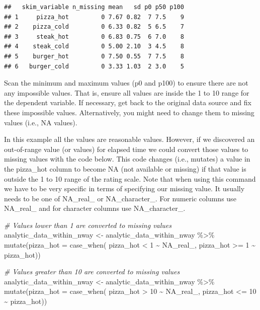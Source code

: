 \documentclass[
]{krantz}
\makeatletter
\newenvironment{Shaded}{\begin{snugshade}}{\end{snugshade}}
\newcommand{\AttributeTok}[1]{\textcolor[rgb]{0.61,0.61,0.61}{#1}}
\newcommand{\CommentTok}[1]{\textcolor[rgb]{0.37,0.37,0.37}{\textit{#1}}}
\newcommand{\ConstantTok}[1]{\textcolor[rgb]{0,0,0}{#1}}
\newcommand{\DecValTok}[1]{\textcolor[rgb]{0.06,0.06,0.06}{#1}}
\newcommand{\FunctionTok}[1]{\textcolor[rgb]{0,0,0}{#1}}
\newcommand{\NormalTok}[1]{#1}
\newcommand{\OtherTok}[1]{\textcolor[rgb]{0.37,0.37,0.37}{#1}}
\newcommand{\SpecialCharTok}[1]{\textcolor[rgb]{0,0,0}{#1}}
\newenvironment{kframe}{%
\medskip{}
\setlength{\fboxsep}{.8em}
 \def\at@end@of@kframe{}%
 \ifinner\ifhmode%
  \def\at@end@of@kframe{\end{minipage}}%
  \begin{minipage}{\columnwidth}%
 \fi\fi%
 \def\FrameCommand##1{\hskip\@totalleftmargin \hskip-\fboxsep
 \colorbox{shadecolor}{##1}\hskip-\fboxsep
     \hskip-\linewidth \hskip-\@totalleftmargin \hskip\columnwidth}%
 \MakeFramed {\advance\hsize-\width
   \@totalleftmargin\z@ \linewidth\hsize
   \@setminipage}}%
 {\par\unskip\endMakeFramed%
 \at@end@of@kframe}
\renewenvironment{Shaded}{\begin{kframe}}{\end{kframe}}
\makeatother
\begin{document}
\begin{verbatim}
##   skim_variable n_missing mean   sd p0 p50 p100
## 1     pizza_hot         0 7.67 0.82  7 7.5    9
## 2    pizza_cold         0 6.33 0.82  5 6.5    7
## 3     steak_hot         0 6.83 0.75  6 7.0    8
## 4    steak_cold         0 5.00 2.10  3 4.5    8
## 5    burger_hot         0 7.50 0.55  7 7.5    8
## 6   burger_cold         0 3.33 1.03  2 3.0    5
\end{verbatim}

Scan the minimum and maximum values (p0 and p100) to ensure there are not any impossible values. That is, ensure all values are inside the 1 to 10 range for the dependent variable. If necessary, get back to the original data source and fix these impossible values. Alternatively, you might need to change them to missing values (i.e., NA values).

In this example all the values are reasonable values. However, if we discovered an out-of-range value (or values) for elapsed time we could convert those values to missing values with the code below. This code changes (i.e., mutates) a value in the pizza\_hot column to become NA (not available or missing) if that value is outside the 1 to 10 range of the rating scale. Note that when using this command we have to be very specific in terms of specifying our missing value. It usually needs to be one of NA\_real\_ or NA\_character\_. For numeric columns use NA\_real\_ and for character columns use NA\_character\_.

\begin{Shaded}
\begin{Highlighting}[]
\CommentTok{\# Values lower than 1 are converted to missing values}
\NormalTok{analytic\_data\_within\_nway }\OtherTok{\textless{}{-}}\NormalTok{ analytic\_data\_within\_nway  }\SpecialCharTok{\%\textgreater{}\%} 
    \FunctionTok{mutate}\NormalTok{(}\AttributeTok{pizza\_hot =} \FunctionTok{case\_when}\NormalTok{(}
\NormalTok{      pizza\_hot }\SpecialCharTok{\textless{}} \DecValTok{1}  \SpecialCharTok{\textasciitilde{}} \ConstantTok{NA\_real\_}\NormalTok{,}
\NormalTok{      pizza\_hot }\SpecialCharTok{\textgreater{}=} \DecValTok{1} \SpecialCharTok{\textasciitilde{}}\NormalTok{ pizza\_hot))}

\CommentTok{\# Values greater than 10 are converted to missing values}
\NormalTok{analytic\_data\_within\_nway }\OtherTok{\textless{}{-}}\NormalTok{ analytic\_data\_within\_nway  }\SpecialCharTok{\%\textgreater{}\%} 
    \FunctionTok{mutate}\NormalTok{(}\AttributeTok{pizza\_hot =} \FunctionTok{case\_when}\NormalTok{(}
\NormalTok{      pizza\_hot }\SpecialCharTok{\textgreater{}} \DecValTok{10}  \SpecialCharTok{\textasciitilde{}} \ConstantTok{NA\_real\_}\NormalTok{,}
\NormalTok{      pizza\_hot }\SpecialCharTok{\textless{}=} \DecValTok{10} \SpecialCharTok{\textasciitilde{}}\NormalTok{ pizza\_hot))}
\end{Highlighting}
\end{Shaded}
\end{document}

